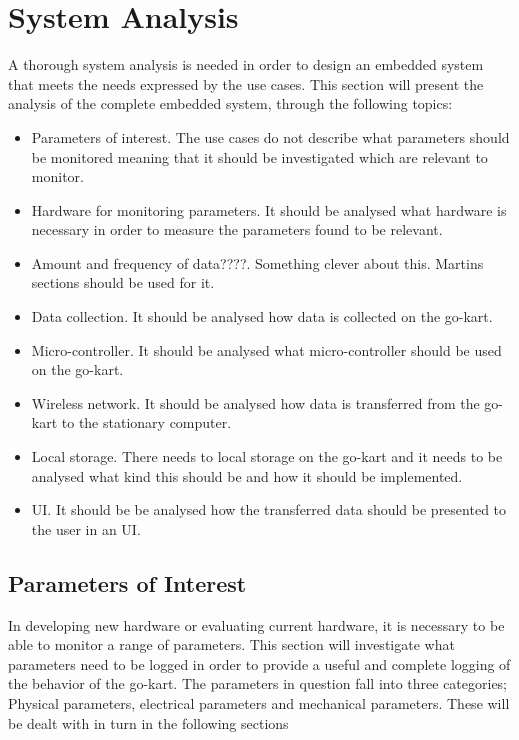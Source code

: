 \section{System Analysis} %
\label{sec:system_analysis}
A thorough system analysis is needed in order to design an embedded system that meets the needs expressed by the use cases. 
This section will present the analysis of the complete embedded system, through the following topics:

\begin{itemize}
\item Parameters of interest. The use cases do not describe what parameters should be monitored meaning that it should be investigated which are relevant to monitor.
\item Hardware for monitoring parameters. It should be analysed what hardware is necessary in order to measure the parameters found to be relevant. 
\item Amount and frequency of data????. Something clever about this. Martins sections should be used for it.
\item Data collection. It should be analysed how data is collected on the go-kart.
\item Micro-controller. It should be analysed what micro-controller should be used on the go-kart.
\item Wireless network. It should be analysed how data is transferred from the go-kart 	to the stationary computer.
\item Local storage. There needs to local storage on the go-kart and it needs to be analysed what kind this should be and how it should be implemented.
\item UI. It should be be analysed how the transferred data should be presented to the user in an UI.
\end{itemize}

\subsection{Parameters of Interest}
\label{sec:parameters}
In developing new hardware or evaluating current hardware, it is necessary to be able to monitor a range of parameters.
This section will investigate what parameters need to be logged in order to provide a useful and complete logging of the behavior of the go-kart.
The parameters in question fall into three categories; Physical parameters, electrical parameters and mechanical parameters.
These will be dealt with in turn in the following sections
